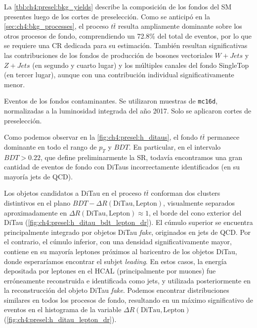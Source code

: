 La \cref{tbl:ch4:presel:bkg_yields} describe la composición de los fondos del SM presentes luego de los cortes de preselección. Como se anticipó en la \cref{sec:ch4:bkg_processes}, el proceso $t\bar{t}$ resulta ampliamente dominante sobre los otros procesos de fondo, comprendiendo un 72.8\% del total de eventos, por lo que se requiere una CR dedicada para su estimación. También resultan significativas las contribuciones de los fondos de producción de bosones vectoriales $W + Jets$ y $Z + Jets$ (en segundo y cuarto lugar) y los múltiples canales del fondo SingleTop (en tercer lugar), aunque con una contribución individual significativamente menor.

\begin{margintable}[3em]
    \setlength{\tabcolsep}{0.7mm}
    
    \caption{Eventos de los fondos contaminantes. Se utilizaron muestras de \texttt{mc16d}, normalizadas a la luminosidad integrada del año 2017. Solo se aplicaron cortes de preselección.}
    \label{tbl:ch4:presel:bkg_yields}
\end{margintable}

Como podemos observar en la \cref{fig:ch4:presel:h_ditaus}, el fondo $t\bar{t}$ permanece dominante en todo el rango de $p_T$ y $BDT$. En particular, en el intervalo $BDT > 0.22$, que define preliminarmente la SR, todavía encontramos una gran cantidad de eventos de fondo con DiTaus incorrectamente identificados (en su mayoría jets de QCD).

Los objetos candidatos a DiTau en el proceso $t\bar{t}$ conforman dos clusters distintivos en el plano $BDT-\Delta R(\text{DiTau}, \text{Lepton})$, visualmente separados aproximadamente en $\Delta R(\text{DiTau}, \text{Lepton}) \approx 1$, el borde del cono exterior del DiTau (\cref{fig:ch4:presel:h_ditau_bdt_lepton_dr}). El cúmulo superior se encuentra principalmente integrado por objetos DiTau \textit{fake}, originados en jets de QCD. Por el contrario, el cúmulo inferior, con una densidad significativamente mayor, contiene en su mayoría leptones próximos al baricentro de los objetos DiTau, donde esperaríamos encontrar el subjet \textit{leading}. En estos casos, la energía depositada por leptones en el HCAL (principalmente por muones) fue erróneamente reconstruida e identificada como jets, y utilizada posteriormente en la reconstrucción del objeto DiTau \textit{fake}. Podemos encontrar distribuciones similares en todos los procesos de fondo, resultando en un máximo significativo de eventos en el histograma de la variable $\Delta R(\text{DiTau}, \text{Lepton})$ (\cref{fig:ch4:presel:h_ditau_lepton_dr}).

